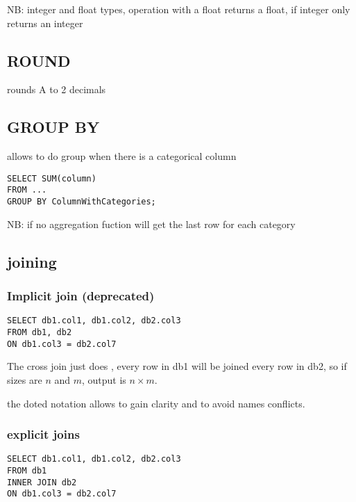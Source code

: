 
		NB: integer and float types, operation with a float returns a float, if integer only returns an integer

	\subsection{ROUND}

		 rounds A to 2 decimals

	\subsection{GROUP BY}

		allows to do group when there is a categorical column

\begin{lstlisting}
SELECT SUM(column)
FROM ...
GROUP BY ColumnWithCategories;
\end{lstlisting}

		NB: if no aggregation fuction will get the last row for each category


	\subsection{joining}

		\subsubsection{Implicit join (deprecated)}

\begin{lstlisting}
SELECT db1.col1, db1.col2, db2.col3
FROM db1, db2
ON db1.col3 = db2.col7
\end{lstlisting}

			The cross join just does , every row in db1 will be joined every row in db2, so if sizes are $n$ and $m$, output is $n \times m$. 

			 the doted notation allows to gain clarity and to avoid names conflicts.

		\subsubsection{explicit joins}

\begin{lstlisting}
SELECT db1.col1, db1.col2, db2.col3
FROM db1
INNER JOIN db2
ON db1.col3 = db2.col7
\end{lstlisting}


